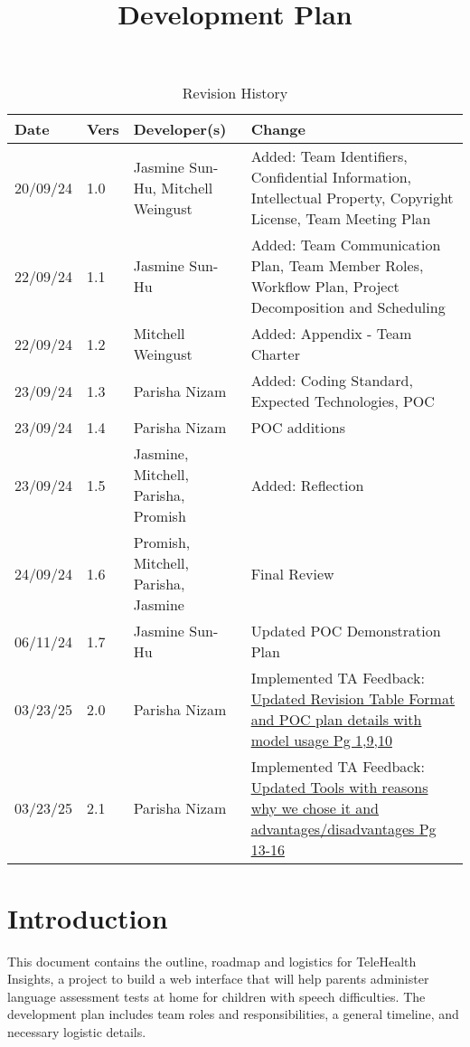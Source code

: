 \documentclass{article}
\title{Development Plan\\\progname}
\author{\authname}
\date{}
\begin{document}
\maketitle

\begin{table}[hp]
\caption{Revision History} \label{TblRevisionHistory}
\begin{tabularx}{\textwidth}{p{1.3cm}p{1cm}p{3cm}X}
\toprule
\textbf{Date} & \textbf{Vers} & \textbf{Developer(s)} & \textbf{Change}\\
\midrule
20/09/24 & 1.0 & Jasmine Sun-Hu, Mitchell Weingust & Added: Team Identifiers, Confidential Information, Intellectual Property,
Copyright License, Team Meeting Plan\\
22/09/24 & 1.1 & Jasmine Sun-Hu & Added: Team Communication Plan, Team Member Roles, Workflow Plan, Project Decomposition and Scheduling\\
22/09/24 & 1.2 & Mitchell Weingust & Added: Appendix - Team Charter\\
23/09/24 & 1.3 & Parisha Nizam & Added: Coding Standard, Expected Technologies, POC \\
23/09/24 & 1.4 & Parisha Nizam & POC additions \\
23/09/24 & 1.5 & Jasmine, Mitchell, Parisha, Promish & Added: Reflection \\
24/09/24 & 1.6 & Promish, Mitchell, Parisha, Jasmine & Final Review\\
06/11/24 & 1.7 & Jasmine Sun-Hu & Updated POC Demonstration Plan\\
03/23/25 & 2.0 & Parisha Nizam & Implemented TA Feedback: \href{https://github.com/parishanizam/TeleHealth/issues/185}{Updated Revision Table Format and POC plan details with model usage Pg 1,9,10} \\
03/23/25 & 2.1 & Parisha Nizam & Implemented TA Feedback: \href{https://github.com/parishanizam/TeleHealth/issues/180}{Updated Tools with reasons why we chose it and advantages/disadvantages Pg 13-16}\\
\bottomrule
\end{tabularx}
\end{table}

\newpage{}

\section*{Introduction}

This document contains the outline, roadmap and logistics for TeleHealth Insights, a project to build a web 
interface that will help parents administer language assessment tests at home for children with speech
difficulties. The development plan includes team roles and responsibilities, a general timeline, and 
necessary logistic details.
\end{document}
